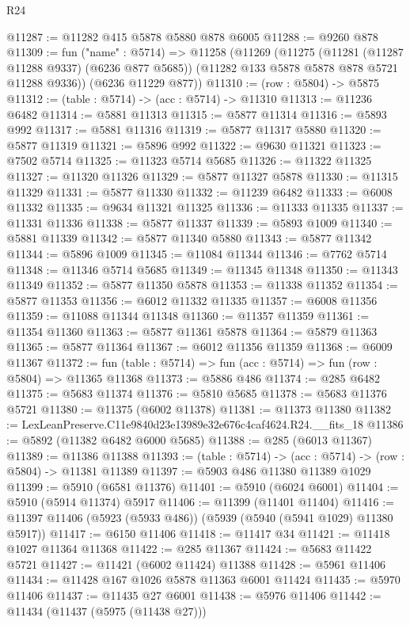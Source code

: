 \begin{lexlean}{R24}
\begin{coremodule}
@11287 := @11282 @415 @5878 @5880 @878 @6005
@11288 := @9260 @878
@11309 := fun ("name" : @5714) =>
  @11258
    (@11269
      (@11275
        (@11281 (@11287 @11288 @9337) (@6236 @877 @5685))
        (@11282 @133 @5878 @5878 @878 @5721 @11288 @9336))
      (@6236 @11229 @877))
@11310 := (row : @5804) -> @5875
@11312 := (table : @5714) -> (acc : @5714) -> @11310
@11313 := @11236 @6482
@11314 := @5881 @11313
@11315 := @5877 @11314
@11316 := @5893 @992
@11317 := @5881 @11316
@11319 := @5877 @11317 @5880
@11320 := @5877 @11319
@11321 := @5896 @992
@11322 := @9630 @11321
@11323 := @7502 @5714
@11325 := @11323 @5714 @5685
@11326 := @11322 @11325
@11327 := @11320 @11326
@11329 := @5877 @11327 @5878
@11330 := @11315 @11329
@11331 := @5877 @11330
@11332 := @11239 @6482
@11333 := @6008 @11332
@11335 := @9634 @11321 @11325
@11336 := @11333 @11335
@11337 := @11331 @11336
@11338 := @5877 @11337
@11339 := @5893 @1009
@11340 := @5881 @11339
@11342 := @5877 @11340 @5880
@11343 := @5877 @11342
@11344 := @5896 @1009
@11345 := @11084 @11344
@11346 := @7762 @5714
@11348 := @11346 @5714 @5685
@11349 := @11345 @11348
@11350 := @11343 @11349
@11352 := @5877 @11350 @5878
@11353 := @11338 @11352
@11354 := @5877 @11353
@11356 := @6012 @11332 @11335
@11357 := @6008 @11356
@11359 := @11088 @11344 @11348
@11360 := @11357 @11359
@11361 := @11354 @11360
@11363 := @5877 @11361 @5878
@11364 := @5879 @11363
@11365 := @5877 @11364
@11367 := @6012 @11356 @11359
@11368 := @6009 @11367
@11372 := fun (table : @5714) => fun (acc : @5714) => fun (row : @5804) => @11365 @11368
@11373 := @5886 @486
@11374 := @285 @6482
@11375 := @5683 @11374
@11376 := @5810 @5685
@11378 := @5683 @11376 @5721
@11380 := @11375 (@6002 @11378)
@11381 := @11373 @11380
@11382 := LexLeanPreserve.C11e9840d23e13989e32e676c4caf4624.R24.__fits_18
@11386 := @5892 (@11382 @6482 @6000 @5685)
@11388 := @285 (@6013 @11367)
@11389 := @11386 @11388
@11393 := (table : @5714) -> (acc : @5714) -> (row : @5804) -> @11381 @11389
@11397 := @5903 @486 @11380 @11389 @1029
@11399 := @5910 (@6581 @11376)
@11401 := @5910 (@6024 @6001)
@11404 := @5910 (@5914 @11374) @5917
@11406 := @11399 (@11401 @11404)
@11416 := @11397 @11406 (@5923 (@5933 @486)) (@5939 (@5940 (@5941 @1029) @11380 @5917))
@11417 := @6150 @11406
@11418 := @11417 @34
@11421 := @11418 @1027 @11364 @11368
@11422 := @285 @11367
@11424 := @5683 @11422 @5721
@11427 := @11421 (@6002 @11424) @11388
@11428 := @5961 @11406
@11434 := @11428 @167 @1026 @5878 @11363 @6001 @11424
@11435 := @5970 @11406
@11437 := @11435 @27 @6001
@11438 := @5976 @11406
@11442 := @11434 (@11437 (@5975 (@11438 @27)))

\end{coremodule}
\end{lexlean}
